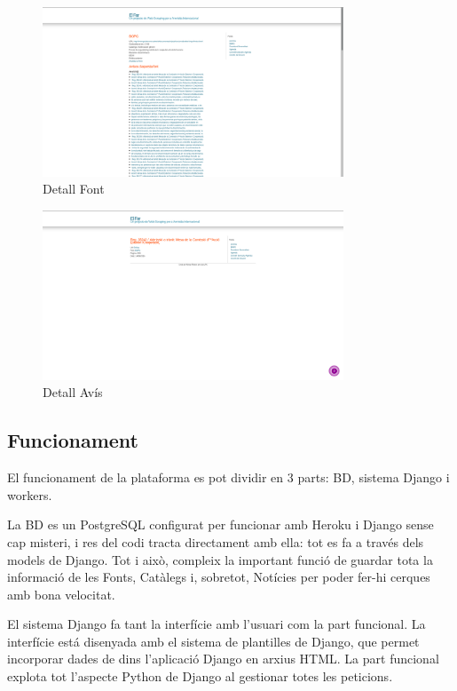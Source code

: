 \documentclass{article}
\begin{document}
\begin{figure}[!ht]
    \centering
    \includegraphics[width=0.8\textwidth]{detall_font.png}
    \caption{Detall Font}
\end{figure}

\newpage

\begin{figure}[!ht]
    \centering
    \includegraphics[width=0.8\textwidth]{detall_avis.png}
    \caption{Detall Avís}
\end{figure}

\newpage

\subsection{Funcionament}

El funcionament de la plataforma es pot dividir en 3 parts: BD, sistema Django i workers.

La BD es un PostgreSQL configurat per funcionar amb Heroku i Django sense cap misteri, i res del codi tracta directament amb ella: tot es fa a través dels models de Django. Tot i això, compleix la important funció de guardar tota la informació de les Fonts, Catàlegs i, sobretot, Notícies per poder fer-hi cerques amb bona velocitat.

El sistema Django fa tant la interfície amb l'usuari com la part funcional. La interfície está disenyada amb el sistema de plantilles de Django, que permet incorporar dades de dins l'aplicació Django en arxius HTML\@. La part funcional explota tot l'aspecte Python de Django al gestionar totes les peticions.
\end{document}
